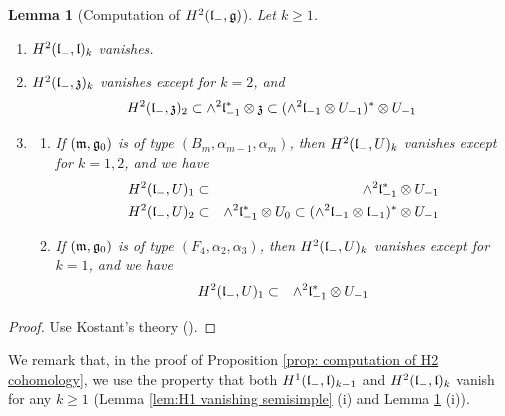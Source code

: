 \documentclass[12pt]{amsart}
\theoremstyle{plain}
\newtheorem{lemma} [theorem]{Lemma}
\theoremstyle{definition}
\begin{document}
\begin{lemma} [Computation of $H^2(\frak l_-, \frak g)$] \label{lem:H2 vanishing semisimple}
 Let $k \geq 1$.

\begin{enumerate}

\item[(i)] $H^2(\frak l_-, \frak l)_k $ vanishes.

\item[(ii)] $H^2(\frak l_-, \frak z)_k  $ vanishes except for $k=2$, and
$$H^2(\frak l_-, \frak z)_2 \subset \wedge^2 \frak l_{-1}^* \otimes \frak z \subset (\wedge^2 \frak l_{-1} \otimes U_{-1})^*\otimes U_{-1} $$

\item[(iii)]
\begin{enumerate}
\item[(1)] If $(\frak m,\frak g_0)$ is of type $(B_m, \alpha_{m-1}, \alpha_m )$, then  $H^{ 2}(\frak l_-, U)_k$  vanishes except for $k=1,2$,  and we have
    \begin{eqnarray*}
    H^2(\frak l_-,  U)_1 &\subset& \wedge^2 \frak l_{-1}^* \otimes U_{-1} \\
    H^2(\frak l_-, U)_2 & \subset& \wedge^2 \frak l_{-1}^* \otimes U_0 \subset (\wedge ^2 \frak  l_{-1}  \otimes \mathfrak l_{-1})^* \otimes U_{-1} \\
    \end{eqnarray*}
\item[(2)] If $(\frak m,\frak g_0)$ is of type $(F_4, \alpha_2, \alpha_3 )$, then $H^{ 2}(\frak l_-, U)_k$   vanishes except for $k=1$, and we have
    \begin{eqnarray*}
    H^2(\frak l_-, U)_1 &\subset& \wedge^2 \frak l_{-1}^* \otimes U_{-1}
    \end{eqnarray*}
\end{enumerate}
\end{enumerate}
\end{lemma}
\begin{proof} Use Kostant's theory (\cite{Ko61}).

\end{proof}

We remark that, in the proof of Proposition \ref{prop: computation of H2 cohomology}, we use the property that both $H^1(\frak l_-, \frak l)_{k-1}$ and $H^2(\frak l_-, \frak l)_k$ vanish for any $k \geq 1$ (Lemma \ref{lem:H1 vanishing semisimple} (i) and Lemma \ref{lem:H2 vanishing semisimple} (i)).
\end{document}
